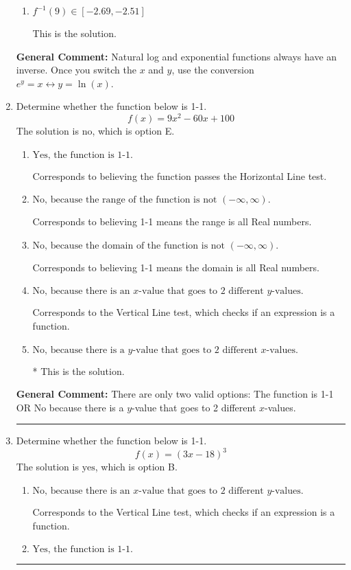 \documentclass{extbook}[14pt]
\newcommand{\litem}[1]{\item #1

\rule{\textwidth}{0.4pt}}
\begin{document}
\begin{enumerate}
{\begin{enumerate}[label=\Alph*.]
 This solution corresponds to distractor 2.
\item \( f^{-1}(9) \in [-2.69, -2.51] \)

 This is the solution.
\end{enumerate}

\textbf{General Comment:} Natural log and exponential functions always have an inverse. Once you switch the $x$ and $y$, use the conversion $ e^y = x \leftrightarrow y=\ln(x)$.
}
\litem{
Determine whether the function below is 1-1.
\[ f(x) = 9 x^2 - 60 x + 100 \]The solution is \( \text{no} \), which is option E.\begin{enumerate}[label=\Alph*.]
\item \( \text{Yes, the function is 1-1.} \)

Corresponds to believing the function passes the Horizontal Line test.
\item \( \text{No, because the range of the function is not $(-\infty, \infty)$.} \)

Corresponds to believing 1-1 means the range is all Real numbers.
\item \( \text{No, because the domain of the function is not $(-\infty, \infty)$.} \)

Corresponds to believing 1-1 means the domain is all Real numbers.
\item \( \text{No, because there is an $x$-value that goes to 2 different $y$-values.} \)

Corresponds to the Vertical Line test, which checks if an expression is a function.
\item \( \text{No, because there is a $y$-value that goes to 2 different $x$-values.} \)

* This is the solution.
\end{enumerate}

\textbf{General Comment:} There are only two valid options: The function is 1-1 OR No because there is a $y$-value that goes to 2 different $x$-values.
}
\litem{
Determine whether the function below is 1-1.
\[ f(x) = (3 x - 18)^3 \]The solution is \( \text{yes} \), which is option B.\begin{enumerate}[label=\Alph*.]
\item \( \text{No, because there is an $x$-value that goes to 2 different $y$-values.} \)

Corresponds to the Vertical Line test, which checks if an expression is a function.
\item \( \text{Yes, the function is 1-1.} \)


\end{enumerate}}
\end{enumerate}
\end{document}
